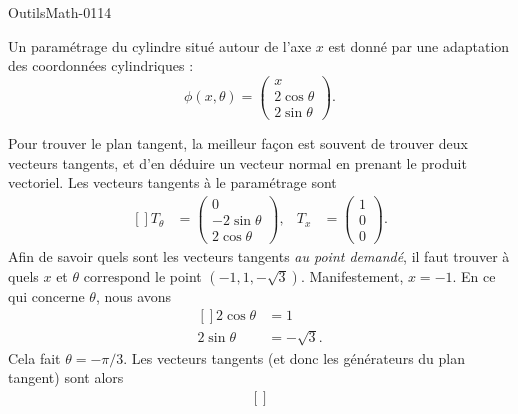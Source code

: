 
\begin{corrige}{OutilsMath-0114}

	Un paramétrage du cylindre situé autour de l'axe $x$ est donné par une adaptation des coordonnées cylindriques :
	\begin{equation}
		\phi(x,\theta)=\begin{pmatrix}
			x           \\
			2\cos\theta \\
			2\sin\theta
		\end{pmatrix}.
	\end{equation}

	Pour trouver le plan tangent, la meilleur façon est souvent de trouver deux vecteurs tangents, et d'en déduire un vecteur normal en prenant le produit vectoriel. Les vecteurs tangents à le paramétrage sont
	\begin{equation}
		\begin{aligned}[]
			T_{\theta} & =\begin{pmatrix}
				              0            \\
				              -2\sin\theta \\
				              2\cos\theta
			              \end{pmatrix}, &
			T_x        & =\begin{pmatrix}
				              1 \\
				              0 \\
				              0
			              \end{pmatrix}.
		\end{aligned}
	\end{equation}
	Afin de savoir quels sont les vecteurs tangents \emph{au point demandé},  il faut trouver à quels $x$ et $\theta$ correspond le point $(-1,1,-\sqrt{3})$. Manifestement, $x=-1$. En ce qui concerne $\theta$, nous avons
	\begin{equation}
		\begin{aligned}[]
			2\cos\theta & =1          \\
			2\sin\theta & =-\sqrt{3}.
		\end{aligned}
	\end{equation}
	Cela fait $\theta=-\pi/3$. Les vecteurs tangents (et donc les générateurs du plan tangent) sont alors
	\begin{equation}
		\begin{aligned}[]

\end{aligned}
\end{equation}
\end{corrige}
